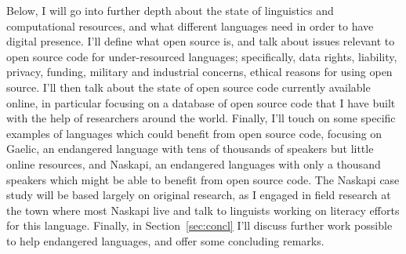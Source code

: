 Below, I will go into further depth about the state of linguistics and computational resources, and what different languages need in order to have digital presence. I'll define what open source is, and talk about issues relevant to open source code for under-resourced languages; specifically, data rights, liability, privacy, funding, military and industrial concerns, ethical reasons for using open source. I'll then talk about the state of open source code currently available online, in particular focusing on a database of open source code that I have built with the help of researchers around the world. Finally, I'll touch on some specific examples of languages which could benefit from open source code, focusing on Gaelic, an endangered language with tens of thousands of speakers but little online resources, and Naskapi, an endangered languages with only a thousand speakers which might be able to benefit from open source code. The Naskapi case study will be based largely on original research, as I engaged in field research at the town where most Naskapi live and talk to linguists working on literacy efforts for this language. Finally, in Section~\ref{sec:concl} I'll discuss further work possible to help endangered languages, and offer some concluding remarks.